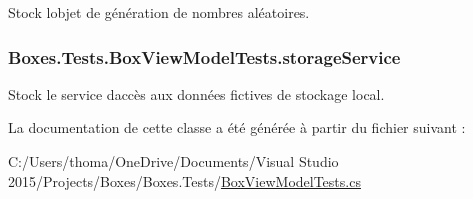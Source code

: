 Stock l\textquotesingle{}objet de génération de nombres aléatoires. 

\subsubsection[{\texorpdfstring{storage\+Service}{storageService}}]{ Boxes.\+Tests.\+Box\+View\+Model\+Tests.\+storage\+Service\hspace{0.3cm}{\ttfamily [private]}}\hypertarget{class_boxes_1_1_tests_1_1_box_view_model_tests_a3abe073002190161d00e791a25d22f32}{}\label{class_boxes_1_1_tests_1_1_box_view_model_tests_a3abe073002190161d00e791a25d22f32}


Stock le service d\textquotesingle{}accès aux données fictives de stockage local. 



La documentation de cette classe a été générée à partir du fichier suivant \+:\begin{DoxyCompactItemize}
\item 
C\+:/\+Users/thoma/\+One\+Drive/\+Documents/\+Visual Studio 2015/\+Projects/\+Boxes/\+Boxes.\+Tests/\hyperlink{_box_view_model_tests_8cs}{Box\+View\+Model\+Tests.\+cs}\end{DoxyCompactItemize}
